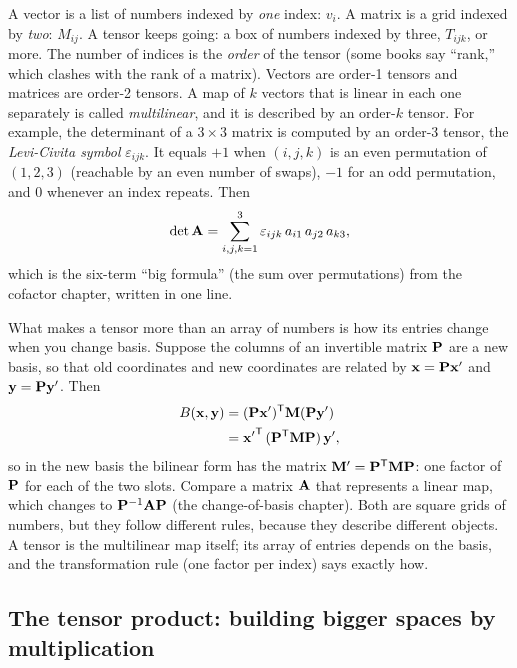 \begin{intuitionbox}
A vector is a list of numbers indexed by \emph{one} index: $v_i$. A matrix is a
grid indexed by \emph{two}: $M_{ij}$. A tensor keeps going: a box of numbers
indexed by three, $T_{ijk}$, or more. The number of indices is the \emph{order} of
the tensor (some books say ``rank,'' which clashes with the rank of a matrix).
Vectors are order-1 tensors and matrices are order-2 tensors. A map of $k$ vectors
that is linear in each one separately is called \emph{multilinear}, and it is
described by an order-$k$ tensor. For example, the determinant of a $3\times 3$
matrix is computed by an order-3 tensor, the \emph{Levi-Civita symbol}
$\varepsilon_{ijk}$. It equals $+1$ when $(i,j,k)$ is an even permutation of
$(1,2,3)$ (reachable by an even number of swaps), $-1$ for an odd permutation, and
$0$ whenever an index repeats. Then
\[
  \det\mathbf{A} = \sum_{i,j,k=1}^{3}\varepsilon_{ijk}\,a_{i1}\,a_{j2}\,a_{k3},
\]
which is the six-term ``big formula'' (the sum over permutations) from the cofactor
chapter, written in one line.
\end{intuitionbox}

What makes a tensor more than an array of numbers is how its entries change when
you change basis. Suppose the columns of an invertible matrix $\mathbf{P}$ are a new
basis, so that old coordinates and new coordinates are related by
$\mathbf{x}=\mathbf{P}\mathbf{x}'$ and $\mathbf{y}=\mathbf{P}\mathbf{y}'$. Then
\begin{align*}
  B(\mathbf{x},\mathbf{y}) &= (\mathbf{P}\mathbf{x}')^{\mathsf{T}}\mathbf{M}(\mathbf{P}\mathbf{y}')\\
  &= {\mathbf{x}'}^{\mathsf{T}}\,(\mathbf{P}^{\mathsf{T}}\mathbf{M}\mathbf{P})\,\mathbf{y}',
\end{align*}
so in the new basis the bilinear form has the matrix $\mathbf{M}'=\mathbf{P}^{\mathsf{T}}\mathbf{M}\mathbf{P}$:
one factor of $\mathbf{P}$ for each of the two slots. Compare a matrix $\mathbf{A}$ that
represents a linear map, which changes to $\mathbf{P}^{-1}\mathbf{A}\mathbf{P}$ (the
change-of-basis chapter). Both are square grids of numbers, but they follow
different rules, because they describe different objects. A tensor is the
multilinear map itself; its array of entries depends on the basis, and the
transformation rule (one factor per index) says exactly how.

\subsection{The tensor product: building bigger spaces by multiplication}
\label{ch37:tensorproduct}

